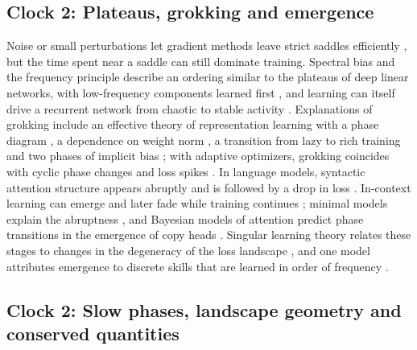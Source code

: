 \subsection{Clock 2: Plateaus, grokking and emergence}

Noise or small perturbations let gradient methods leave strict saddles efficiently \citep{ge2015escaping,jin2017escape}, but the time spent near a saddle can still dominate training. Spectral bias and the frequency principle describe an ordering similar to the plateaus of deep linear networks, with low-frequency components learned first \citep{rahaman2018spectral,xu2019frequency}, and learning can itself drive a recurrent network from chaotic to stable activity \citep{vaidya2026learninginduced}. Explanations of grokking include an effective theory of representation learning with a phase diagram \citep{liu2022grokking}, a dependence on weight norm \citep{liu2022omnigrok}, a transition from lazy to rich training \citep{kumar2023grokking} and two phases of implicit bias \citep{lyu2023dichotomy}; with adaptive optimizers, grokking coincides with cyclic phase changes and loss spikes \citep{thilak2022slingshot}. In language models, syntactic attention structure appears abruptly and is followed by a drop in loss \citep{chen2023sudden}. In-context learning can emerge and later fade while training continues \citep{singh2023transient}; minimal models explain the abruptness \citep{reddy2023mechanistic}, and Bayesian models of attention predict phase transitions in the emergence of copy heads \citep{lavie2026phase}. Singular learning theory relates these stages to changes in the degeneracy of the loss landscape \citep{hoogland2024loss}, and one model attributes emergence to discrete skills that are learned in order of frequency \citep{michaud2023quantization}.

\subsection{Clock 2: Slow phases, landscape geometry and conserved quantities}

